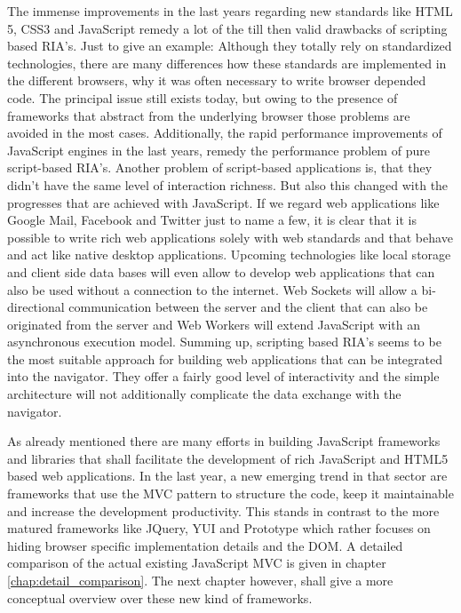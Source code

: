 The immense improvements in the last years regarding new standards like HTML 5, CSS3 and JavaScript remedy a lot of the till then valid drawbacks of scripting based RIA's.
Just to give an example: Although they totally rely on standardized technologies, there are many differences how these standards are implemented in the different browsers, why it was often necessary to write browser depended code.
The principal issue still exists today, but owing to the presence of frameworks that abstract from the underlying browser those problems are avoided in the most cases.
Additionally, the rapid performance improvements of JavaScript engines in the last years, remedy the performance problem of pure script-based RIA's.
Another problem of script-based applications is, that they didn't have the same level of interaction richness.
But also this changed with the progresses that are achieved with JavaScript.
If we regard web applications like Google Mail, Facebook and Twitter just to name a few, it is clear that it is possible to write rich web applications solely with web standards and that behave and act like native desktop applications.
Upcoming technologies like local storage and client side data bases will even allow to develop web applications that can also be used without a connection to the internet.
Web Sockets will allow a bi-directional communication between the server and the client that can also be originated from the server and Web Workers will extend JavaScript with an asynchronous execution model.
Summing up, scripting based RIA's seems to be the most suitable approach for building web applications that can be integrated into the navigator. 
They offer a fairly good level of interactivity and the simple architecture will not additionally complicate the data exchange with the navigator. 

As already mentioned there are many efforts in building JavaScript frameworks and libraries that shall facilitate the development of rich JavaScript and HTML5 based web applications.
In the last year, a new emerging trend in that sector are frameworks that use the MVC pattern to structure the code, keep it maintainable and increase the development productivity.
This stands in contrast to the more matured frameworks like JQuery, YUI and Prototype which rather focuses on hiding browser specific implementation details and the DOM.
A detailed comparison of the actual existing JavaScript MVC is given in chapter \ref{chap:detail_comparison}.
The next chapter however, shall give a more conceptual overview over these new kind of frameworks.
 
